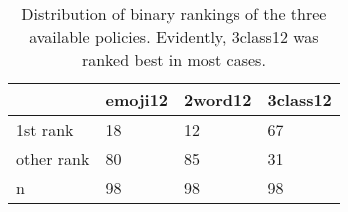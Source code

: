 \begin{table}
	\centering
	\caption{\label{tab:pws_pers:distribution-binary-ranks} Distribution of binary rankings of the three available policies. Evidently, 3class12 was ranked best in most cases. }
	\begin{tabular}{llll}
		~ 			& emoji12	& 2word12 	& 3class12 \\ \hline\hline
		1st rank	& 18		& 12		& 67 \\
		other rank 	& 80 		& 85 		& 31 \\ \hline
		n			& 98		& 98		& 98		 
	\end{tabular}
\end{table}
